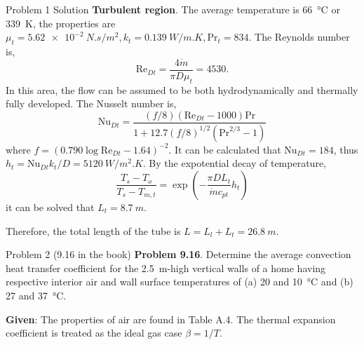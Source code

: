 \documentclass[9pt, aspectratio=169, handout]{beamer}
\begin{document}
\begin{frame}[allowframebreaks]{Problem 1 Solution}
    \textbf{Turbulent region}. The average temperature is \SI{66}{\celsius} or \SI{339}{K}, the properties are $\mu_{t} = \SI{5.62e-2}{N.s/m^2}, k_t = \SI{0.139}{W/m.K}, \mathrm{Pr}_t = 834$. The Reynolds number is,
    \begin{equation*}
        \mathrm{Re}_{Dt} = \frac{4\dot{m}}{\pi D \mu_t} = 4530.
    \end{equation*}
    In this area, the flow can be assumed to be both hydrodynamically and thermally fully developed. The Nusselt number is,
    \begin{equation*}
        \mathrm{Nu}_{Dt} = \frac{(f/8) (\mathrm{Re}_{Dt} - 1000)\mathrm{Pr}}{1 + 12.7 (f/8)^{1/2} (\mathrm{Pr}^{2/3} - 1)}
    \end{equation*}
    where $f = (0.790\log \mathrm{Re}_{Dt} - 1.64)^{-2}$. It can be calculated that $\mathrm{Nu}_{Dt} = 184$, thus $h_{t} = \mathrm{Nu}_{Dt}k_t / D = \SI{5120}{W/m^2.K}$. By the expotential decay of temperature,
    \begin{equation*}
        \frac{T_s - T_{o}}{T_s - T_{m, t}} = \exp\left( -\frac{\pi D L_t}{\dot{m} c_{pt}}h_t \right)
    \end{equation*}
    it can be solved that $L_t = \SI{8.7}{m}$.

    Therefore, the total length of the tube is $L = L_l + L_t = \SI{26.8}{m}$.
\end{frame}

\begin{frame}{Problem 2 (9.16 in the book)}
    \textbf{Problem 9.16}. Determine the average convection heat transfer coefficient for the \SI{2.5}{m}-high vertical walls of a home having respective interior air and wall surface temperatures of (a) 20 and \SI{10}{\celsius} and (b) 27 and \SI{37}{\celsius}.

    \vspace{1ex}
    \textbf{Given}: The properties of air are found in Table A.4. The thermal expansion coefficient is treated as the ideal gas case $\beta = 1/T$.
\end{frame}
\end{document}
